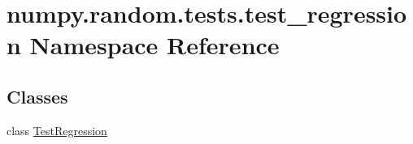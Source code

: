 \hypertarget{namespacenumpy_1_1random_1_1tests_1_1test__regression}{}\section{numpy.\+random.\+tests.\+test\+\_\+regression Namespace Reference}
\label{namespacenumpy_1_1random_1_1tests_1_1test__regression}
\subsection*{Classes}
\begin{DoxyCompactItemize}
\item 
class \hyperlink{classnumpy_1_1random_1_1tests_1_1test__regression_1_1TestRegression}{Test\+Regression}
\end{DoxyCompactItemize}
